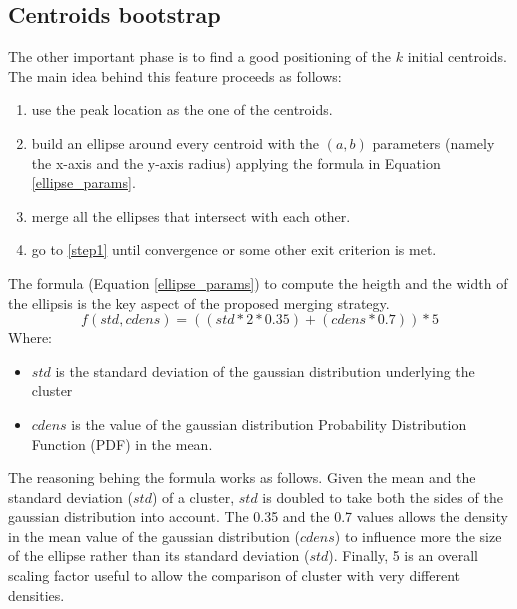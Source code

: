 \subsection*{Centroids bootstrap}
The other important phase is to find a good positioning of the $k$ initial centroids.
The main idea behind this feature proceeds as follows:
\begin{enumerate}
    \item \label{step1} use the peak location as the one of the centroids.
    \item build an ellipse around every centroid with the $(a,b)$ parameters (namely the x-axis
        and the y-axis radius) applying the formula in Equation \ref{ellipse_params}.
    \item merge all the ellipses that intersect with each other.
    \item go to \ref{step1} until convergence or some other exit criterion is met.
\end{enumerate}


The formula (Equation \ref{ellipse_params}) to compute the heigth and the width of the ellipsis 
is the key aspect of the proposed merging strategy.
\begin{equation}
\label{ellipse_params}
    f(std, cdens) = ((std * 2 * 0.35) + (cdens * 0.7)) * 5
\end{equation}
Where:
\begin{itemize}
    \item $std$ is the standard deviation of the gaussian distribution underlying the cluster
    \item $cdens$ is the value of the gaussian distribution Probability Distribution Function (PDF)
        in the mean.
\end{itemize}

The reasoning behing the formula works as follows. Given the mean and the standard deviation ($std$)
of a cluster, $std$ is doubled to take both the sides of the gaussian distribution into account.
The 0.35 and the 0.7 values allows the density in the mean value of the gaussian distribution ($cdens$) 
to influence more the size of the ellipse rather than its standard deviation ($std$). Finally, 5 is
an overall scaling factor useful to allow the comparison of cluster with very different densities.


